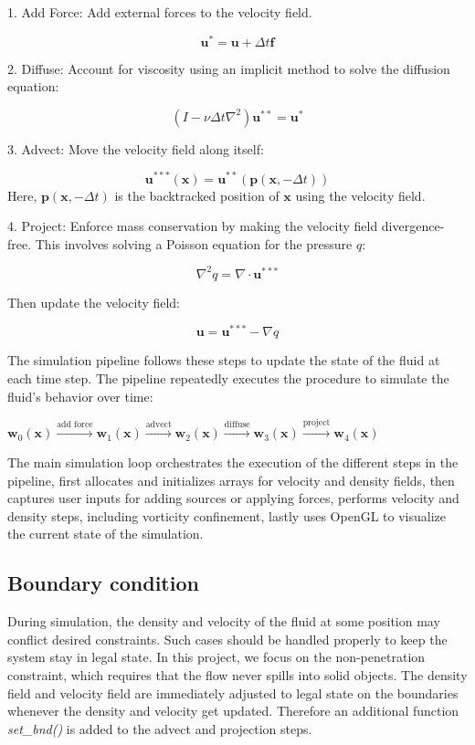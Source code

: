 1. Add Force:
Add external forces to the velocity field.
    
    \[
    \mathbf{u}^* = \mathbf{u} + \Delta t \mathbf{f}
    \]
    
2. Diffuse:
Account for viscosity using an implicit method to solve the diffusion equation:
    
    \[
    \left( I - \nu \Delta t \nabla^2 \right) \mathbf{u}^{**} = \mathbf{u}^*
    \]
    
3. Advect:
Move the velocity field along itself:
    
    \[
    \mathbf{u}^{***}(\mathbf{x}) = \mathbf{u}^{**}(\mathbf{p}(\mathbf{x}, -\Delta t))
    \]
    Here, \(\mathbf{p}(\mathbf{x}, -\Delta t)\) is the backtracked position of \(\mathbf{x}\) using the velocity field.
    
4. Project:
Enforce mass conservation by making the velocity field divergence-free. This involves solving a Poisson equation for the pressure \(q\):
    
    \[
    \nabla^2 q = \nabla \cdot \mathbf{u}^{***}
    \]
    
    Then update the velocity field:
    
    \[
    \mathbf{u} = \mathbf{u}^{***} - \nabla q
    \]


The simulation pipeline follows these steps to update the state of the fluid at each time step. The pipeline repeatedly executes the procedure to simulate the fluid's behavior over time:

$\mathbf{w}_0(\mathbf{x}) \xrightarrow{\text{add force}} \mathbf{w}_1(\mathbf{x}) \xrightarrow{\text{advect}} \mathbf{w}_2(\mathbf{x}) \xrightarrow{\text{diffuse}} \mathbf{w}_3(\mathbf{x}) \xrightarrow{\text{project}} \mathbf{w}_4(\mathbf{x})$

The main simulation loop orchestrates the execution of the different steps in the pipeline, first allocates and initializes arrays for velocity and density fields, then captures user inputs for adding sources or applying forces, performs velocity and density steps, including vorticity confinement, lastly uses OpenGL to visualize the current state of the simulation.
\subsection{Boundary condition}
\label{sec:bnd}
During simulation, the density and velocity of the fluid at some position may conflict desired constraints. Such cases should be handled properly to keep the system stay in legal state. In this project, we focus on the non-penetration constraint, which requires that the flow never spills into solid objects. The density field and velocity field are immediately adjusted to legal state on the boundaries whenever the density and velocity get updated. Therefore an additional function \emph{set\_bnd()} is added to the advect and projection steps.  

